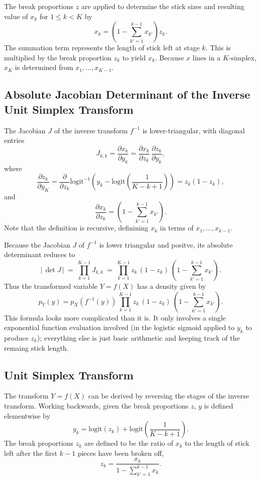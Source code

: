 \documentclass[10pt]{report}
\begin{document}
The break proportions $z$ are applied to determine the stick sizes and
resulting value of $x_k$ for $1 \leq k < K$ by
%
\[
x_k = 
\left( 1 - \sum_{k'=1}^{k-1} x_{k'} \right) z_k.
\]
%
The summation term represents the length of stick left at stage $k$.
This is multiplied by the break proportion $z_k$ to yield $x_k$.
Because $x$ lines in a $K$-simplex, $x_K$ is determined from
$x_1,\ldots,x_{K-1}$.

\subsection{Absolute Jacobian Determinant of the Inverse Unit Simplex
  Transform}

The Jacobian $J$ of the inverse transform $f^{-1}$ is
lower-triangular, with diagonal entries
\[
J_{k,k}
=
\frac{\partial x_k}{\partial y_k}
=
\frac{\partial x_k}{\partial z_k} \,
\frac{\partial z_k}{\partial y_k},
\]
%
where
\[
\frac{\partial z_k}{\partial y_K} 
= \frac{\partial}{\partial z_k} 
   \mbox{logit}^{-1} \left(
                       y_k - \mbox{logit} \left( \frac{1}{K-k+1}
                                          \right)
                    \right)
= z_k (1 - z_k),
\]
%
and
%
\[
\frac{\partial x_k}{\partial z_k}
=
\left( 
  1 - \sum_{k' = 1}^{k-1} x_{k'}
   \right)
.
\]
%
Note that the definition is recursive, definining $x_k$ in terms of
$x_{1},\ldots,x_{k-1}$.

Because the Jacobian $J$ of $f^{-1}$ is lower triangular and positve, its
absolute determinant reduces to
%
\[
\left| \, \det J \, \right|
\ = \
\prod_{k=1}^{K-1} J_{k,k}
\ = \
\prod_{k=1}^{K-1} 
z_k
\, 
(1 - z_k)
\
\left(
1 - \sum_{k'=1}^{k-1} x_{k'}
\right)
.
\]
%
Thus the transformed variable $Y = f(X)$ has a density given by
%
\[
p_Y(y) 
= p_X(f^{-1}(y))
\,
\prod_{k=1}^{K-1} 
z_k
\, 
(1 - z_k)
\
\left(
1 - \sum_{k'=1}^{k-1} x_{k'}
\right)
.
\]
%
This formula looks more complicated than it is.  It only involves a
single exponential function evaluation involved (in the logistic
sigmoid applied to $y_k$ to produce $z_k$);  everything else is just
basic arithmetic and keeping track of the remaing stick length.

\subsection{Unit Simplex Transform}

The transform $Y = f(X)$ can be derived by reversing the stages of the
inverse transform.  Working backwards, given the break proportions
$z$, $y$ is defined elementwise by
%
\[
y_k 
= \mbox{logit}(z_k)
+ \mbox{logit}\left(
   \frac{1}{K-k+1}
   \right)
.
\]
%
The break proportions $z_k$ are defined to be the ratio of $x_k$ to
the length of stick left after the first $k-1$ pieces have been broken
off, 
%
\[
z_k 
= \frac{x_k}
       {1 - \sum_{k' = 1}^{k-1} x_k}
.
\]
\end{document}
